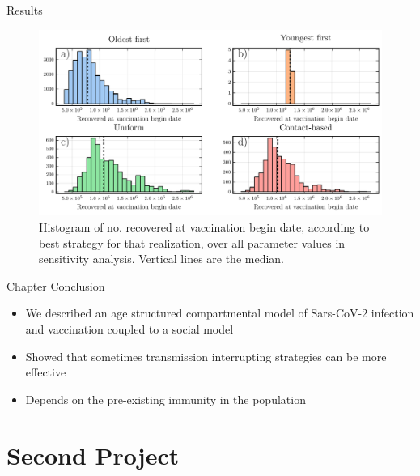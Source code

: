 \documentclass{beamer}
\begin{document}
\begin{frame}{Results}
\begin{figure}
    \includegraphics[width = \textwidth]{covid/histograms.pdf}
    \caption{Histogram of no. recovered at vaccination begin date, according to best strategy for that realization, over all parameter values in sensitivity analysis. Vertical lines are the median.}
\end{figure}
\end{frame}
\begin{frame}{Chapter Conclusion}
    \begin{itemize}
        \item We described an age structured compartmental model of Sars-CoV-2 infection and vaccination coupled to a social model 
        \item Showed that sometimes transmission interrupting strategies can be more effective
        \item Depends on the pre-existing immunity in the population
    \end{itemize}
\end{frame}





\section{Second Project}
\end{document}
